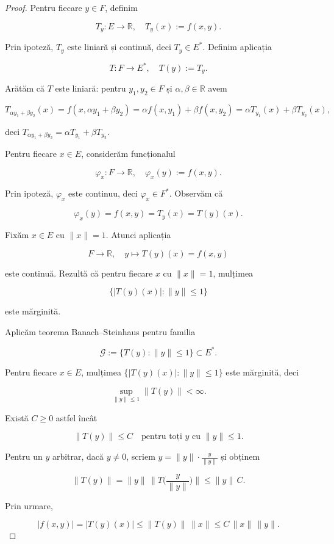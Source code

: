 \documentclass[12pt]{article}
\theoremstyle{definition}
\theoremstyle{plain}
\begin{document}
\begin{proof}
Pentru fiecare $y \in F$, definim


\[
T_y : E \to \mathbb{R}, \quad T_y(x) := f(x,y).
\]


Prin ipoteză, $T_y$ este liniară și continuă, deci $T_y \in E^*$. Definim aplicația


\[
T : F \to E^*, \quad T(y) := T_y.
\]


Arătăm că $T$ este liniară: pentru $y_1,y_2 \in F$ și $\alpha,\beta \in \mathbb{R}$ avem


\[
T_{\alpha y_1 + \beta y_2}(x)
= f(x,\alpha y_1 + \beta y_2)
= \alpha f(x,y_1) + \beta f(x,y_2)
= \alpha T_{y_1}(x) + \beta T_{y_2}(x),
\]


deci $T_{\alpha y_1 + \beta y_2} = \alpha T_{y_1} + \beta T_{y_2}$.

Pentru fiecare $x \in E$, considerăm funcționalul


\[
\varphi_x : F \to \mathbb{R}, \quad \varphi_x(y) := f(x,y).
\]


Prin ipoteză, $\varphi_x$ este continuu, deci $\varphi_x \in F^*$. Observăm că


\[
\varphi_x(y) = f(x,y) = T_y(x) = T(y)(x).
\]


Fixăm $x \in E$ cu $\|x\| = 1$. Atunci aplicația


\[
F \to \mathbb{R}, \quad y \mapsto T(y)(x) = f(x,y)
\]


este continuă. Rezultă că pentru fiecare $x$ cu $\|x\|=1$, mulțimea


\[
\{ |T(y)(x)| : \|y\| \le 1 \}
\]


este mărginită.

Aplicăm teorema Banach--Steinhaus pentru familia


\[
\mathcal{G} := \{ T(y) : \|y\| \le 1 \} \subset E^*.
\]


Pentru fiecare $x \in E$, mulțimea $\{ |T(y)(x)| : \|y\| \le 1 \}$ este mărginită, deci


\[
\sup_{\|y\|\le 1} \|T(y)\| < \infty.
\]


Există $C \ge 0$ astfel încât


\[
\|T(y)\| \le C \quad \text{pentru toți } y \text{ cu } \|y\|\le 1.
\]


Pentru un $y$ arbitrar, dacă $y \neq 0$, scriem $y = \|y\| \cdot \frac{y}{\|y\|}$ și obținem


\[
\|T(y)\|
= \|y\| \,\Big\|T\Big(\frac{y}{\|y\|}\Big)\Big\|
\le \|y\| \, C.
\]


Prin urmare,


\[
|f(x,y)| = |T(y)(x)| \le \|T(y)\|\,\|x\| \le C \,\|x\|\,\|y\|.
\]


\end{proof}
\end{document}
